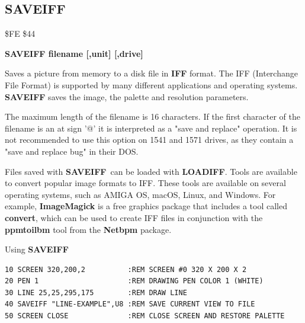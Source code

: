 \subsection{SAVEIFF}
\begin{description}[leftmargin=2cm,style=nextline]
\item [Token:] \$FE \$44
\item [Format:] {\bf SAVEIFF filename [,unit] [,drive]}
\item [Usage:]

   Saves a picture from memory to a disk file in {\bf IFF} format.
   The IFF (Interchange File Format) is supported by many different applications
   and operating systems. {\bf SAVEIFF} saves the image, the palette
   and resolution parameters.

   \filenamedefinition
   The maximum length of the filename is 16 characters.
   If the first character of the filename is an at sign '@' it
   is interpreted as a "save and replace" operation. It is not recommended
   to use this option on 1541 and 1571 drives, as they
   contain a "save and replace bug" in their DOS.

   \drivedefinition

   \unitdefinition


\item [Remarks:]
   Files saved with {\bf SAVEIFF} can be loaded with {\bf LOADIFF}.
   Tools are available to convert popular image formats to IFF. These tools
   are available on several operating systems, such as AMIGA OS, macOS, Linux, and Windows.
   For example, {\bf ImageMagick} is a free graphics package that includes a tool
   called {\bf convert}, which can be used to create IFF files in conjunction
   with the {\bf ppmtoilbm} tool from the {\bf Netbpm} package.

\item [Example:] Using {\bf SAVEIFF}
\begin{tcolorbox}[colback=black,coltext=white]
\verbatimfont{\codefont}
\begin{verbatim}
10 SCREEN 320,200,2          :REM SCREEN #0 320 X 200 X 2
20 PEN 1                     :REM DRAWING PEN COLOR 1 (WHITE)
30 LINE 25,25,295,175        :REM DRAW LINE
40 SAVEIFF "LINE-EXAMPLE",U8 :REM SAVE CURRENT VIEW TO FILE
50 SCREEN CLOSE              :REM CLOSE SCREEN AND RESTORE PALETTE
\end{verbatim}
\end{tcolorbox}
\end{description}

